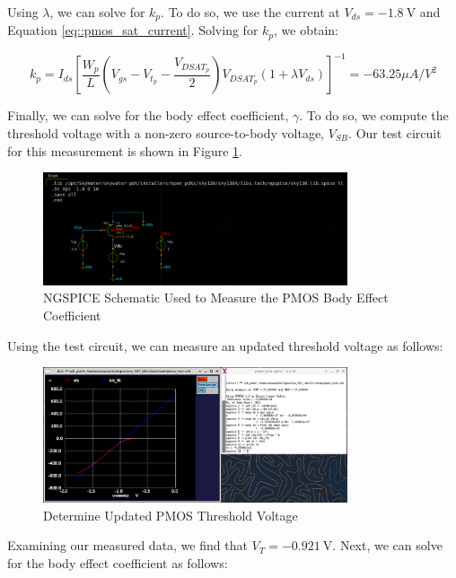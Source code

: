 \documentclass[fleqn]{article}
\begin{document}
	\noindent Using $\lambda$, we can solve for $k_p$. To do so, we use the current at $V_{ds}=-1.8\ \text{V}$ and Equation \ref{eq::pmos_sat_current}. Solving for $k_p$, we obtain:
	
	\begin{equation}
		k_p = I_{ds}\left[\frac{W_p}{L}\left(V_{gs} - V_{t_p} - \frac{V_{DSAT_p}}{2}\right)V_{DSAT_p}(1 + {\lambda}V_{ds})\right]^{-1} = -63.25 {\mu}A/V^2
	\end{equation}
	
	Finally, we can solve for the body effect coefficient, $\gamma$. To do so, we compute the threshold voltage with a non-zero source-to-body voltage, $V_{SB}$. Our test circuit for this measurement is shown in Figure \ref{fig::pmos_gamma_meas_schem}.
	
	 \begin{figure}[H]
		\centerline{\includegraphics[width=0.8\textwidth]{pmos_gamma_meas_schem.png}}
		\caption{NGSPICE Schematic Used to Measure the PMOS Body Effect Coefficient}
		\label{fig::pmos_gamma_meas_schem}
	\end{figure}
	
	\noindent Using the test circuit, we can measure an updated threshold voltage as follows:
	
	\begin{figure}[H]
		\centerline{\includegraphics[width=0.8\textwidth]{pmos_gamma_meas.png}}
		\caption{Determine Updated PMOS Threshold Voltage}
		\label{fig::pmos_gamma_meas}
	\end{figure}
	
	\noindent Examining our measured data, we find that $V_T = -0.921\ \text{V}$. Next, we can solve for the body effect coefficient as follows:
	
\end{document}
